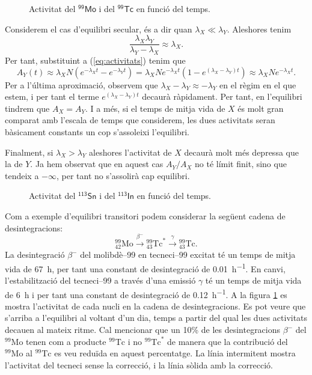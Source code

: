 \documentclass[12pt]{article}
\begin{document}
\begin{figure}[b]
	\center
	
	\caption{Activitat del \( \mathsf{{}^{99}\text{Mo}} \) i del \( \mathsf{{}^{99}\text{Tc}} \) en funció del temps.}
	\label{fig:equilibri transitori}
\end{figure}
Considerem el cas d'equilibri secular, és a dir quan \( \lambda_X \ll \lambda_Y \). Aleshores tenim 
\begin{equation*}
	\frac{\lambda_X \lambda_Y}{\lambda_Y - \lambda_X} \approx \lambda_X.
\end{equation*}
Per tant, substituint a (\ref{eq:activitats}) tenim que 
\begin{equation*}
	A_Y(t) \approx \lambda_X N \left(e^{-\lambda_X t} - e^{-\lambda_Y t}\right) = \lambda_X N e^{-\lambda_X t} \left(1 - e^{(\lambda_X -\lambda_Y) t}\right) \approx \lambda_X N e^{-\lambda_X t}.
\end{equation*}
Per a l'última aproximació, observem que \( \lambda_X - \lambda_Y \approx -\lambda_Y \) en el règim en el que estem, i per tant el terme \( e^{(\lambda_X - \lambda_Y) t} \) decaurà ràpidament. Per tant, en l'equilibri tindrem que \( A_X = A_Y \). I a més, si el temps de mitja vida de \( X \) és molt gran comparat amb l'escala de temps que considerem, les dues activitats seran bàsicament constants un cop s'assoleixi l'equilibri.

Finalment, si \( \lambda_X > \lambda_Y \) aleshores l'activitat de \( X \) decaurà molt més depressa que la de \( Y \). Ja hem observat que en aquest cas \( A_Y/A_X \) no té límit finit, sino que tendeix a \( -\infty \), per tant no s'assolirà cap equilibri. 

\begin{figure}[htb]
	\center
	
	\caption{Activitat del \( \mathsf{{}^{113}\text{Sn}} \) i del \( \mathsf{{}^{113}\text{In}} \) en funció del temps.}
	\label{fig:equilibri secular}
\end{figure}
Com a exemple d'equilibri transitori podem considerar la següent cadena de desintegracions:
\begin{equation*}
	{}_{42}^{99} \mathrm{Mo} \xrightarrow{\beta^-} {}_{43}^{99} \mathrm{Tc}^{\ast} \xrightarrow{\gamma} {}_{43}^{99} \mathrm{Tc}.
\end{equation*}
La desintegració \( \beta^- \) del molibdè--99 en tecneci--99 excitat té un temps de mitja vida de \SI{67}{h}, per tant una constant de desintegració de \SI{0.01}{h^{-1}}. En canvi, l'estabilització del tecneci--99 a través d'una emissió \( \gamma \) té un temps de mitja vida de \SI{6}{h} i per tant una constant de desintegració de \SI{0.12}{h^{-1}}. A la figura \ref{fig:equilibri transitori} es mostra l'activitat de cada nucli en la cadena de desintegracions. Es pot veure que s'arriba a l'equilibri al voltant d'un dia, temps a partir del qual les dues activitats decauen al mateix ritme. Cal mencionar que un \num{10}\% de les desintegracions \( \beta^- \) del \( {}^{99}\text{Mo} \) tenen com a producte \( {}^{99}\text{Tc} \) i no \( {}^{99}\text{Tc}^{\ast} \) de manera que la contribució del \(  {}^{99}\text{Mo} \) al \( {}^{99}\text{Tc} \) es veu reduïda en aquest percentatge. La línia intermitent mostra l'activitat del tecneci sense la correcció, i la línia sòlida amb la correcció.
\end{document}
